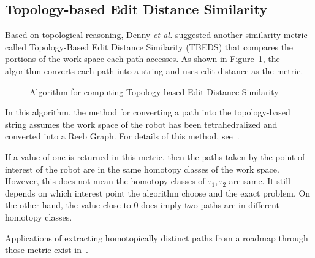 \subsection{Topology-based Edit Distance Similarity}
Based on topological reasoning, Denny \emph{et al.} suggested another similarity metric called Topology-Based Edit Distance Similarity (TBEDS)  that compares the portions of the work space each path accesses.
As shown in Figure~\ref{fig:tbeds}, the algorithm converts each path into a string and uses edit distance as the metric.
\begin{figure}
  \caption{Algorithm for computing Topology-based Edit Distance Similarity}
  \label{fig:tbeds}
\end{figure}
In this algorithm, the method for converting a path into the topology-based string assumes the work space of the robot has been tetrahedralized and converted into a Reeb Graph. For details of this method, see~\cite{denny2018topology}.

If a value of one is returned in this metric, then the paths taken by the point of interest of the robot are in the same homotopy classes of the work space. However, this does not mean the homotopy classes of \(\tau_1,\tau_2\) are same. It still depends on which interest point the algorithm choose and the exact problem. On the other hand, the value close to \(0\) does imply two paths are in different homotopy classes.

Applications of extracting homotopically distinct paths from a roadmap through those metric exist in~\cite{denny2018topology}.